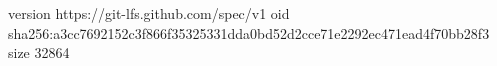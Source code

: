 version https://git-lfs.github.com/spec/v1
oid sha256:a3cc7692152c3f866f35325331dda0bd52d2cce71e2292ec471ead4f70bb28f3
size 32864
